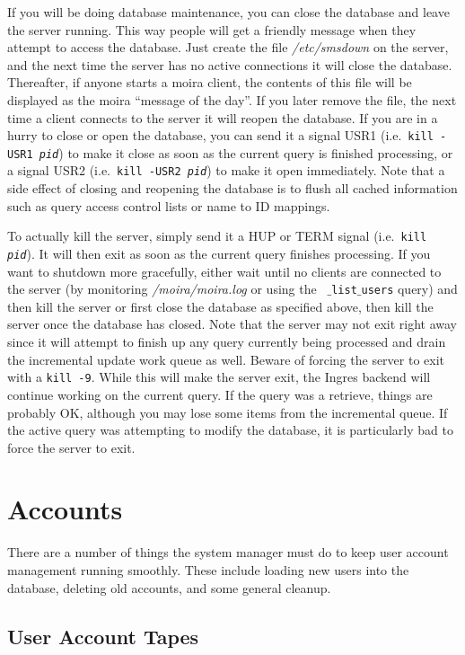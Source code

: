 If you will be doing database maintenance, you can close the database
and leave the server running.  This way people will get a friendly
message when they attempt to access the database.  Just create the
file {\em /etc/smsdown} on the server, and the next time the server
has no active connections it will close the database.  Thereafter, if
anyone starts a moira client, the contents of this file will be
displayed as the moira ``message of the day''.  If you later remove
the file, the next time a client connects to the server it will reopen
the database.  If you are in a hurry to close or open the database,
you can send it a signal USR1 (i.e.\ {\tt kill -USR1 {\em pid}}) to
make it close as soon as the current query is finished processing, or
a signal USR2 (i.e.\ {\tt kill -USR2 {\em pid}}) to make it open
immediately.  Note that a side effect of closing and reopening the
database is to flush all cached information such as query access
control lists or name to ID mappings.

To actually kill the server, simply send it a HUP or TERM signal
(i.e.\ {\tt kill {\em pid}}).  It will then exit as soon as the
current query finishes processing.  If you want to shutdown more
gracefully, either wait until no clients are connected to the server
(by monitoring {\em /moira/moira.log} or using the {\tt
$\_$list$\_$users} query) and then kill the server or first close the
database as specified above, then kill the server once the database
has closed.  Note that the server may not exit right away since it
will attempt to finish up any query currently being processed and
drain the incremental update work queue as well.  Beware of forcing
the server to exit with a {\tt kill -9}.  While this will make the
server exit, the Ingres backend will continue working on the current
query.  If the query was a retrieve, things are probably OK, although
you may lose some items from the incremental queue.  If the active
query was attempting to modify the database, it is particularly bad to
force the server to exit.

\section{Accounts}

There are a number of things the system manager must do to keep user
account management running smoothly.  These include loading new users
into the database, deleting old accounts, and some general cleanup.

\subsection{User Account Tapes}

